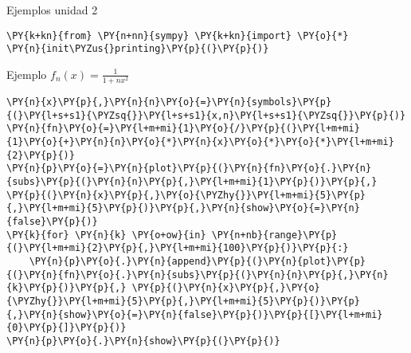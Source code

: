  Ejemplos unidad 2

    \begin{tcolorbox}[breakable, size=fbox, boxrule=1pt, pad at break*=1mm,colback=cellbackground, colframe=cellborder]
\begin{Verbatim}[commandchars=\\\{\}]
\PY{k+kn}{from} \PY{n+nn}{sympy} \PY{k+kn}{import} \PY{o}{*}
\PY{n}{init\PYZus{}printing}\PY{p}{(}\PY{p}{)}
\end{Verbatim}
\end{tcolorbox}

    Ejemplo \(f_n(x)=\frac{1}{1+nx^2}\)

    \begin{tcolorbox}[breakable, size=fbox, boxrule=1pt, pad at break*=1mm,colback=cellbackground, colframe=cellborder]
\begin{Verbatim}[commandchars=\\\{\}]
\PY{n}{x}\PY{p}{,}\PY{n}{n}\PY{o}{=}\PY{n}{symbols}\PY{p}{(}\PY{l+s+s1}{\PYZsq{}}\PY{l+s+s1}{x,n}\PY{l+s+s1}{\PYZsq{}}\PY{p}{)}
\PY{n}{fn}\PY{o}{=}\PY{l+m+mi}{1}\PY{o}{/}\PY{p}{(}\PY{l+m+mi}{1}\PY{o}{+}\PY{n}{n}\PY{o}{*}\PY{n}{x}\PY{o}{*}\PY{o}{*}\PY{l+m+mi}{2}\PY{p}{)}
\PY{n}{p}\PY{o}{=}\PY{n}{plot}\PY{p}{(}\PY{n}{fn}\PY{o}{.}\PY{n}{subs}\PY{p}{(}\PY{n}{n}\PY{p}{,}\PY{l+m+mi}{1}\PY{p}{)}\PY{p}{,} \PY{p}{(}\PY{n}{x}\PY{p}{,}\PY{o}{\PYZhy{}}\PY{l+m+mi}{5}\PY{p}{,}\PY{l+m+mi}{5}\PY{p}{)}\PY{p}{,}\PY{n}{show}\PY{o}{=}\PY{n}{false}\PY{p}{)}
\PY{k}{for} \PY{n}{k} \PY{o+ow}{in} \PY{n+nb}{range}\PY{p}{(}\PY{l+m+mi}{2}\PY{p}{,}\PY{l+m+mi}{100}\PY{p}{)}\PY{p}{:}
    \PY{n}{p}\PY{o}{.}\PY{n}{append}\PY{p}{(}\PY{n}{plot}\PY{p}{(}\PY{n}{fn}\PY{o}{.}\PY{n}{subs}\PY{p}{(}\PY{n}{n}\PY{p}{,}\PY{n}{k}\PY{p}{)}\PY{p}{,} \PY{p}{(}\PY{n}{x}\PY{p}{,}\PY{o}{\PYZhy{}}\PY{l+m+mi}{5}\PY{p}{,}\PY{l+m+mi}{5}\PY{p}{)}\PY{p}{,}\PY{n}{show}\PY{o}{=}\PY{n}{false}\PY{p}{)}\PY{p}{[}\PY{l+m+mi}{0}\PY{p}{]}\PY{p}{)}
\PY{n}{p}\PY{o}{.}\PY{n}{show}\PY{p}{(}\PY{p}{)}
\end{Verbatim}
\end{tcolorbox}

    \begin{center}
    \end{center}
    { \hspace*{\fill} \\}
    
